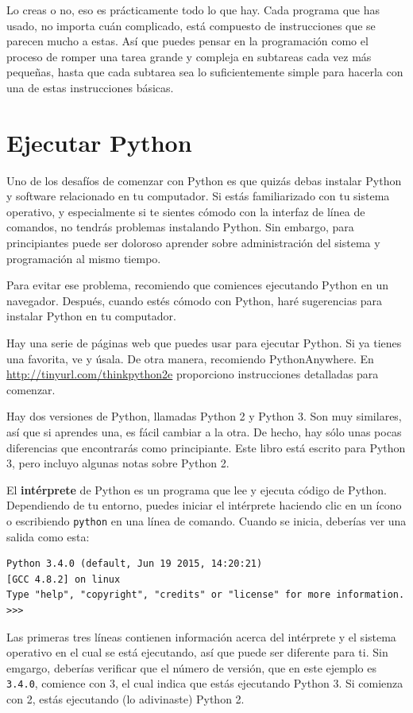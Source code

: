 \documentclass[10pt]{book}
\begin{document}
Lo creas o no, eso es prácticamente todo lo que hay.  Cada
programa que has usado, no importa cuán complicado, está compuesto de
instrucciones que se parecen mucho a estas.  Así que puedes pensar en
la programación como el proceso de romper una tarea grande y compleja en
subtareas cada vez más pequeñas, hasta que cada subtarea sea lo suficientemente
simple para hacerla con una de estas instrucciones básicas.


\section{Ejecutar Python}

Uno de los desafíos de comenzar con Python es que quizás debas
instalar Python y software relacionado en tu computador.
Si estás familiarizado con tu sistema operativo, y especialmente
si te sientes cómodo con la interfaz de línea de comandos, no tendrás
problemas instalando Python.  Sin embargo, para principiantes puede ser
doloroso aprender sobre administración del sistema y programación al
mismo tiempo.

Para evitar ese problema, recomiendo que comiences ejecutando Python
en un navegador.  Después, cuando estés cómodo con Python, haré
sugerencias para instalar Python en tu computador.

Hay una serie de páginas web que puedes usar para ejecutar Python.  Si ya
tienes una favorita, ve y úsala.  De otra manera, recomiendo
PythonAnywhere.  En \url{http://tinyurl.com/thinkpython2e}
proporciono instrucciones detalladas para comenzar.

Hay dos versiones de Python, llamadas Python 2 y Python 3.
Son muy similares, así que si aprendes una, es fácil cambiar
a la otra.  De hecho, hay sólo unas pocas diferencias que encontrarás
como principiante.
Este libro está escrito para Python 3, pero incluyo algunas notas
sobre Python 2.

El {\bf intérprete} de Python es un programa que lee y ejecuta
código de Python.  Dependiendo de tu entorno, puedes iniciar el intérprete
haciendo clic en un ícono o escribiendo {\tt python} en una
línea de comando.
Cuando se inicia, deberías ver una salida como esta:

\begin{verbatim}
Python 3.4.0 (default, Jun 19 2015, 14:20:21)
[GCC 4.8.2] on linux
Type "help", "copyright", "credits" or "license" for more information.
>>>
\end{verbatim}
%
Las primeras tres líneas contienen información acerca del intérprete
y el sistema operativo en el cual se está ejecutando, así que puede ser
diferente para ti.  Sin emgargo, deberías verificar que el número de versión, que
en este ejemplo es {\tt 3.4.0}, comience con 3, el cual indica que estás
ejecutando Python 3.  Si comienza con 2, estás ejecutando
(lo adivinaste) Python 2.
\end{document}
